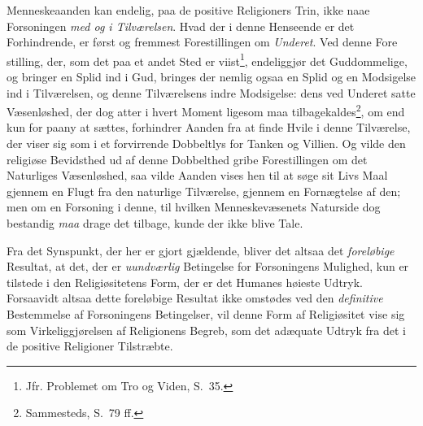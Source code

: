 Menneskeaanden kan endelig, paa de positive Religioners Trin, ikke naae Forsoningen
\emph{med og i Tilværelsen}. Hvad der i denne Henseende er det Forhindrende, er
først og fremmest Forestillingen om \emph{Underet}. Ved denne Fore\-%
\setcounter{footnote}{0}%
stilling, der, som det paa et andet Sted er viist\footnote{Jfr. Problemet om Tro og
Viden, S.\ 35.}, endeliggjør det Guddommelige, og bringer en Splid ind i Gud,
bringes der nemlig ogsaa en Splid og en Modsigelse ind i Tilværelsen, og denne
Tilværelsens indre Modsigelse: dens ved Underet satte Væsenløshed, der dog atter i
hvert Moment ligesom maa tilbagekaldes\footnote{Sammesteds, S.\ 79 ff.}, om end kun
for paany at sættes, forhindrer Aanden fra at finde Hvile i denne Tilværelse, der
viser sig som i et forvirrende Dobbeltlys for Tanken og Villien. Og vilde den
religiøse Bevidsthed ud af denne Dobbelthed gribe Forestillingen om det Naturliges
Væsenløshed, saa vilde Aanden vises hen til at søge sit Livs Maal gjennem en Flugt
fra den naturlige Tilværelse, gjennem en Fornægtelse af den; men om en Forsoning i
denne, til hvilken Menneskevæsenets Naturside dog bestandig \emph{maa} drage det
tilbage, kunde der ikke blive Tale.

Fra det Synspunkt, der her er gjort gjældende, bliver det altsaa det
\emph{foreløbige} Resultat, at det, der er \emph{uundværlig} Betingelse for
Forsoningens Mulighed, kun er tilstede i den Religiøsitetens Form, der er det
Humanes høieste Udtryk. Forsaavidt altsaa dette foreløbige Resultat ikke omstødes
ved den \emph{definitive} Bestemmelse af Forsoningens Betingelser, vil denne Form
af Religiøsitet vise sig som Virkeliggjørelsen af Religionens Begreb, som det
adæquate Udtryk fra det i de positive Religioner Tilstræbte.


